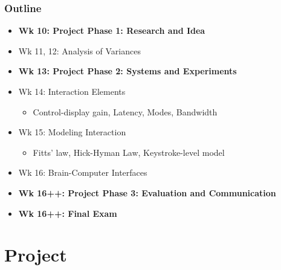 \documentclass{beamer}
\begin{document}
\begin{frame}
	\frametitle{Outline}
	\begin{itemize}
		\item \textbf{Wk 10: Project Phase 1: Research and Idea}
		\item Wk 11, 12: Analysis of Variances
		\item \textbf{Wk 13:  Project Phase 2: Systems and Experiments}
		\item Wk 14: Interaction Elements
		\begin{itemize}
			\item Control-display gain, Latency, Modes, Bandwidth
		\end{itemize}
		\item Wk 15: Modeling Interaction
		\begin{itemize}
			\item Fitts' law, Hick-Hyman Law, Keystroke-level model
		\end{itemize}
		\item Wk 16: Brain-Computer Interfaces
		\item \textbf{Wk 16++: Project Phase 3: Evaluation and Communication}
		\item \textbf{Wk 16++: Final Exam}
	\end{itemize}
\end{frame}

\section{Project} %
\end{document}
